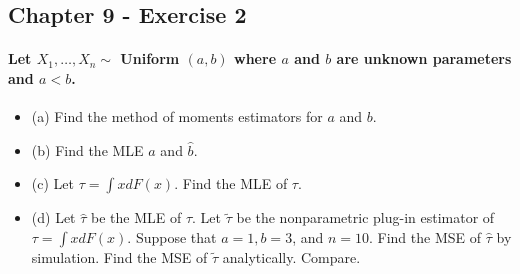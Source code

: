 \documentclass{article}
\begin{document}
\subsection{Chapter 9 - Exercise 2}
\paragraph{Let $X_{1}, \ldots, X_{n} \sim$ Uniform $(a, b)$ where $a$ and $b$ are unknown parameters and $a<b$.}
\begin{itemize}
    \item (a) Find the method of moments estimators for $a$ and $b$.
    \item (b) Find the MLE $\hat{a}$ and $\hat{b}$.
    \item (c) Let $\tau=\int x d F(x)$. Find the MLE of $\tau$.
    \item (d) Let $\hat{\tau}$ be the MLE of $\tau$. Let $\widetilde{\tau}$ be the nonparametric plug-in estimator of $\tau=\int x d F(x)$. Suppose that $a=1, b=3$, and $n=10$. Find the MSE of $\hat{\tau}$ by simulation. Find the MSE of $\widetilde{\tau}$ analytically. Compare.
\end{itemize}
\end{document}
